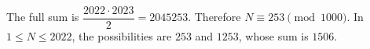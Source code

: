 The full sum is $\dfrac{2022\cdot2023}{2}=2045253$. Therefore $N\equiv253\pmod{1000}$. In $1\le N\le2022$, the possibilities are $253$ and $1253$, whose sum is $\boxed{1506}$.
